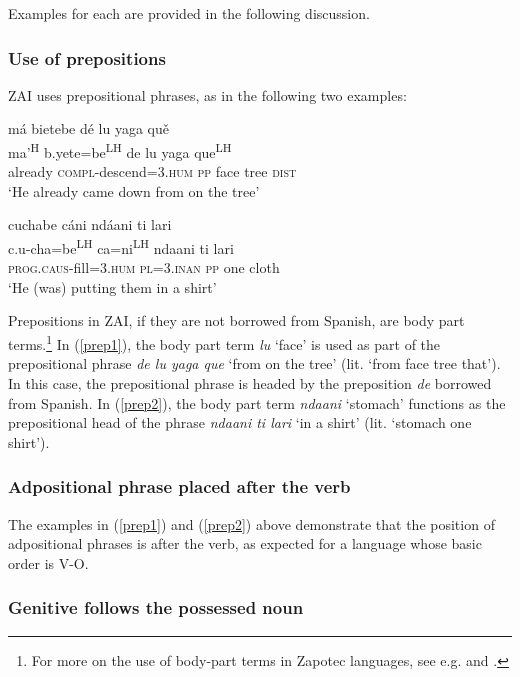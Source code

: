 Examples for each are provided in the following discussion.


\subsubsection{Use of prepositions}

ZAI uses prepositional phrases, as in the following two examples:

\ea\label{prep1}
\glll m\'{a} bietebe d\'{e} lu yaga qu\v{e} \\
ma'\textsuperscript{H} b.yete=be\textsuperscript{LH} de lu yaga que\textsuperscript{LH} \\
already \textsc{compl}-descend=\textsc{3.hum} \textsc{pp} face tree \textsc{dist} \\
\glt `He already came down from on the tree' 
\z

\ea\label{prep2}
\glll cuchabe c\'{a}ni nd\'{a}ani ti lari \\
c.u-cha=be\textsuperscript{LH} ca=ni\textsuperscript{LH} ndaani ti lari \\
\textsc{prog.caus}-fill=\textsc{3.hum} \textsc{pl=3.inan} \textsc{pp} one cloth \\
\glt `He (was) putting them in a shirt'		
\z

Prepositions in ZAI, if they are not borrowed from Spanish, are body part terms.\footnote{For more on the use of body-part terms in Zapotec languages, see e.g. \citet{maclaury1989} and \citet{perez2011b}.} In (\ref{prep1}), the body part term \textit{lu} `face' is used as part of the prepositional phrase \textit{de lu yaga que} `from on the tree' (lit. `from face tree that'). In this case, the prepositional phrase is headed by the preposition \textit{de} borrowed from Spanish. In (\ref{prep2}), the body part term \textit{ndaani} `stomach' functions as the prepositional head of the phrase \textit{ndaani ti lari} `in a shirt' (lit. `stomach one shirt').


\subsubsection{Adpositional phrase placed after the verb}

The examples in (\ref{prep1}) and (\ref{prep2}) above demonstrate that the position of adpositional phrases is after the verb, as expected for a language whose basic order is V-O.



\subsubsection{Genitive follows the possessed noun}

